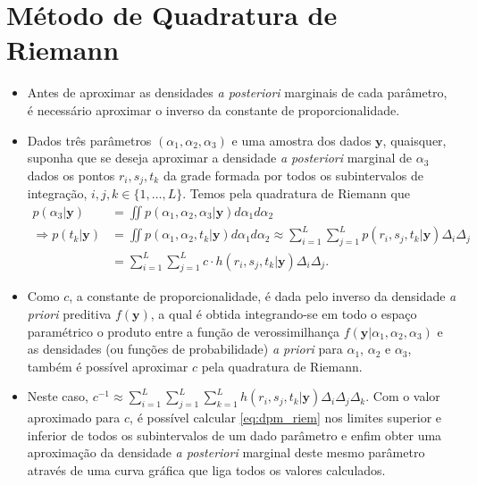 \documentclass[9pt]{beamer}
\begin{document}
\section{Método de Quadratura de Riemann}
\begin{frame}
\begin{itemize}
\justifying	
\item Antes de aproximar as densidades \textit{a posteriori} marginais de cada parâmetro, é necessário aproximar o inverso da constante de proporcionalidade.
\item Dados três parâmetros $(\alpha_1, \alpha_2, \alpha_3)$ e uma amostra dos dados $\mathbf{y}$, quaisquer, suponha que se deseja aproximar a densidade \textit{a posteriori} marginal de $\alpha_3$ dados os pontos $r_i, s_j, t_k$ da grade formada por todos os subintervalos de integração, $i, j, k \in \{1, \ldots, L\}$. Temos pela quadratura de Riemann que
\begin{align}
p(\alpha_3 | \bm{y})
&= \iint p(\alpha_1, \alpha_2, \alpha_3 | \bm{y}) d\alpha_1 d\alpha_2 \nonumber \\
\Rightarrow p(t_k | \bm{y})
&= \iint p(\alpha_1, \alpha_2, t_k | \bm{y}) d\alpha_1 d\alpha_2 \approx \sum_{i=1}^{L} \sum_{j=1}^{L} p(r_i, s_j, t_k | \bm{y}) \Delta_i \Delta_j \nonumber \\
&= \sum_{i=1}^{L} \sum_{j=1}^{L} c \cdot h(r_i, s_j, t_k | \bm{y}) \Delta_i \Delta_j. \label{eq:dpm_riem}
\end{align}
\end{itemize}
\end{frame}
\begin{frame}
\begin{itemize}
\justifying	
\item Como $c$, a constante de proporcionalidade, é dada pelo inverso da densidade \textit{a priori} preditiva $f(\bm{y})$, a qual é obtida integrando-se em todo o espaço paramétrico o produto entre a função de verossimilhança $f(\bm{y} | \alpha_1, \alpha_2, \alpha_3)$ e as densidades (ou funções de probabilidade) \textit{a priori} para $\alpha_1$, $\alpha_2$ e $\alpha_3$, também é possível aproximar $c$ pela quadratura de Riemann.
\item Neste caso, $c^{-1} \approx \sum_{i=1}^{L} \sum_{j=1}^{L} \sum_{k=1}^{L} h(r_i, s_j, t_k | \bm{y}) \Delta_i \Delta_j \Delta_k$. Com o valor aproximado para $c$, é possível calcular \eqref{eq:dpm_riem} nos limites superior e inferior de todos os subintervalos de um dado parâmetro e enfim obter uma aproximação da densidade \emph{a posteriori} marginal deste mesmo parâmetro através de uma curva gráfica que liga todos os valores calculados.
\end{itemize}
\end{frame}
\end{document}
